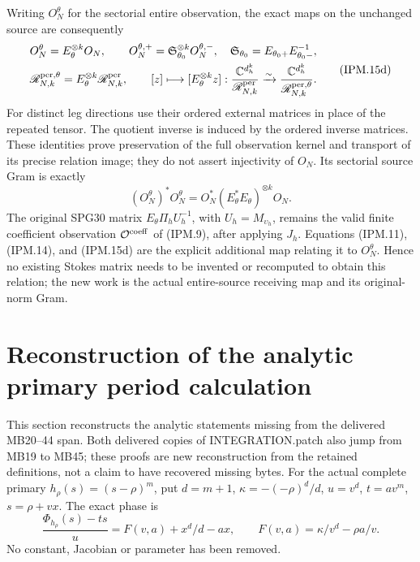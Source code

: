 \documentclass[11pt,a4paper]{article}
\theoremstyle{definition}
\begin{document}
Writing \(O_N^\theta\) for the sectorial entire observation, the exact
maps on the unchanged source are consequently
\[
 \begin{gathered}
 O_N^\theta=E_\theta^{\otimes k}O_N,\qquad
 O_N^{\theta,+}=\mathfrak S_{\theta_0}^{\otimes k}O_N^{\theta,-},
 \quad \mathfrak S_{\theta_0}=E_{\theta_0+}E_{\theta_0-}^{-1},\\
 \mathscr R_{N,k}^{\mathrm{per},\theta}
      =E_\theta^{\otimes k}\mathscr R_{N,k}^{\rm per},\qquad
 [z]\longmapsto[E_\theta^{\otimes k}z]:
 \frac{\mathbb C^{d_h^k}}{\mathscr R_{N,k}^{\rm per}}
       \xrightarrow{\sim}
 \frac{\mathbb C^{d_h^k}}{\mathscr R_{N,k}^{\mathrm{per},\theta}}.
 \end{gathered}
 \tag{IPM.15d}
\]
For distinct leg directions use their ordered external matrices in
place of the repeated tensor. The quotient inverse is induced by the
ordered inverse matrices. These identities prove preservation of the
full observation kernel and transport of its precise relation image;
they do not assert injectivity of \(O_N\). Its sectorial source Gram is
exactly
\[
 (O_N^\theta)^*O_N^\theta
      =O_N^*(E_\theta^*E_\theta)^{\otimes k}O_N.
 \tag{IPM.15e}
\]
The original SPG30 matrix \(E_\theta\Pi_hU_h^{-1}\), with
\(U_h=M_{\upsilon_h}\), remains the valid finite coefficient
observation \(\mathcal O^{\rm coeff}\) of (IPM.9), after applying
\(J_h\). Equations (IPM.11), (IPM.14), and (IPM.15d) are the
explicit additional map relating it to \(O_N^\theta\). Hence no
existing Stokes matrix needs to be invented or recomputed to obtain
this relation; the new work is the actual entire-source receiving
map and its original-norm Gram.

\section{Reconstruction of the analytic primary period calculation}
\label{sec:ipm-primary-period}

This section reconstructs the analytic statements missing from the
delivered MB20--44 span. Both delivered copies of INTEGRATION.patch
also jump from MB19 to MB45; these proofs are new reconstruction from
the retained definitions, not a claim to have recovered missing bytes.
For the actual complete primary \(h_\rho(s)=(s-\rho)^m\), put
\(d=m+1\),
\(\kappa=-(-\rho)^d/d\), \(u=v^d\), \(t=av^m\),
\(s=\rho+vx\). The exact phase is
\[
 \frac{\Phi_{h_\rho}(s)-ts}{u}
    =F(v,a)+x^d/d-ax,\qquad
 F(v,a)=\kappa/v^d-\rho a/v.
 \tag{IPM.16}
\]
No constant, Jacobian or parameter has been removed.
\end{document}
